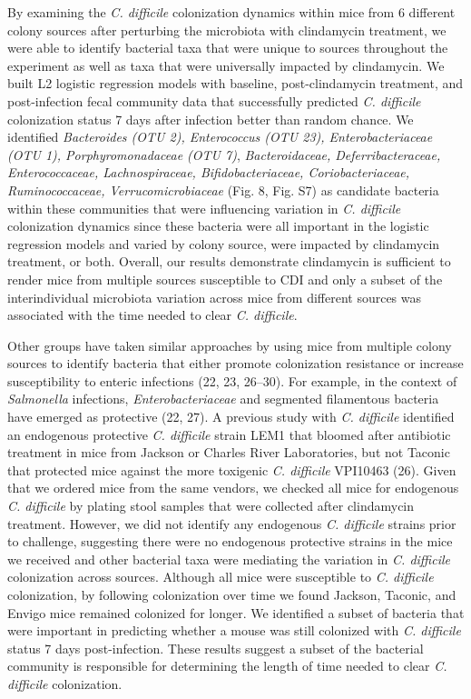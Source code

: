 \documentclass[11pt,]{article}
\begin{document}
By examining the \emph{C. difficile} colonization dynamics within mice
from 6 different colony sources after perturbing the microbiota with
clindamycin treatment, we were able to identify bacterial taxa that were
unique to sources throughout the experiment as well as taxa that were
universally impacted by clindamycin. We built L2 logistic regression
models with baseline, post-clindamycin treatment, and post-infection
fecal community data that successfully predicted \emph{C. difficile}
colonization status 7 days after infection better than random chance. We
identified \emph{Bacteroides (OTU 2), Enterococcus (OTU 23),
Enterobacteriaceae (OTU 1), Porphyromonadaceae (OTU 7)},
\emph{Bacteroidaceae, Deferribacteraceae, Enterococcaceae,
Lachnospiraceae, Bifidobacteriaceae, Coriobacteriaceae, Ruminococcaceae,
Verrucomicrobiaceae} (Fig. 8, Fig. S7) as candidate bacteria within
these communities that were influencing variation in \emph{C. difficile}
colonization dynamics since these bacteria were all important in the
logistic regression models and varied by colony source, were impacted by
clindamycin treatment, or both. Overall, our results demonstrate
clindamycin is sufficient to render mice from multiple sources
susceptible to CDI and only a subset of the interindividual microbiota
variation across mice from different sources was associated with the
time needed to clear \emph{C. difficile}.

Other groups have taken similar approaches by using mice from multiple
colony sources to identify bacteria that either promote colonization
resistance or increase susceptibility to enteric infections (22, 23,
26--30). For example, in the context of \emph{Salmonella} infections,
\emph{Enterobacteriaceae} and segmented filamentous bacteria have
emerged as protective (22, 27). A previous study with \emph{C.
difficile} identified an endogenous protective \emph{C. difficile}
strain LEM1 that bloomed after antibiotic treatment in mice from Jackson
or Charles River Laboratories, but not Taconic that protected mice
against the more toxigenic \emph{C. difficile} VPI10463 (26). Given that
we ordered mice from the same vendors, we checked all mice for
endogenous \emph{C. difficile} by plating stool samples that were
collected after clindamycin treatment. However, we did not identify any
endogenous \emph{C. difficile} strains prior to challenge, suggesting
there were no endogenous protective strains in the mice we received and
other bacterial taxa were mediating the variation in \emph{C. difficile}
colonization across sources. Although all mice were susceptible to
\emph{C. difficile} colonization, by following colonization over time we
found Jackson, Taconic, and Envigo mice remained colonized for longer.
We identified a subset of bacteria that were important in predicting
whether a mouse was still colonized with \emph{C. difficile} status 7
days post-infection. These results suggest a subset of the bacterial
community is responsible for determining the length of time needed to
clear \emph{C. difficile} colonization.
\end{document}
